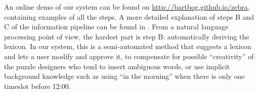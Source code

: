 An online demo of our system can be found on \url{http://bartbog.github.io/zebra}, containing examples of all the steps. 
A more detailed explanation of steps B and C of the information pipeline can be found in \cite{msc/Claes17}. From a natural language processing point of view, the hardest part is step B: automatically deriving the lexicon. In our system, this is a semi-automated method that suggests a lexicon and lets a user modify and approve it, to compensate for possible ``creativity'' of the puzzle designers who tend to insert ambiguous words, or use implicit background knowledge such as using ``in the morning'' when there is only one timeslot before 12:00.
